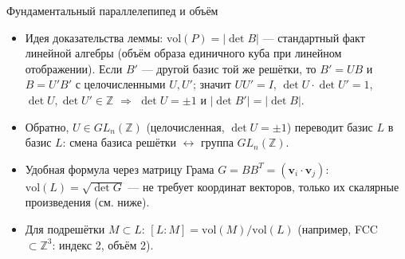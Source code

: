 \documentclass[serif, aspectratio=169]{beamer}
\begin{document}
\begin{frame}{Фундаментальный параллелепипед и объём}
{\begin{itemize}
            \item Идея доказательства леммы: $\mathrm{vol}(P)=|\det B|$ --- стандартный факт линейной алгебры (объём образа единичного куба при линейном отображении). Если $B'$ --- другой базис той же решётки, то $B'=UB$ и $B=U'B'$ с целочисленными $U,U'$; значит $UU'=I$, $\det U\cdot\det U'=1$, $\det U,\det U'\in\mathbb{Z}$ $\Rightarrow$ $\det U=\pm1$ и $|\det B'|=|\det B|$.
            \item Обратно, $U\in GL_n(\mathbb{Z})$ (целочисленная, $\det U=\pm1$) переводит базис $L$ в базис $L$: смена базиса решётки $\leftrightarrow$ группа $GL_n(\mathbb{Z})$.
            \item Удобная формула через матрицу Грама $G=BB^{T}=(\mathbf{v}_i\cdot\mathbf{v}_j)$: $\mathrm{vol}(L)=\sqrt{\det G}$ --- не требует координат векторов, только их скалярные произведения (см. ниже).
            \item Для подрешётки $M\subset L$: $[L:M]=\mathrm{vol}(M)/\mathrm{vol}(L)$ (например, FCC $\subset\mathbb{Z}^3$: индекс 2, объём 2).
        \end{itemize}
    }
\end{frame}
\end{document}
